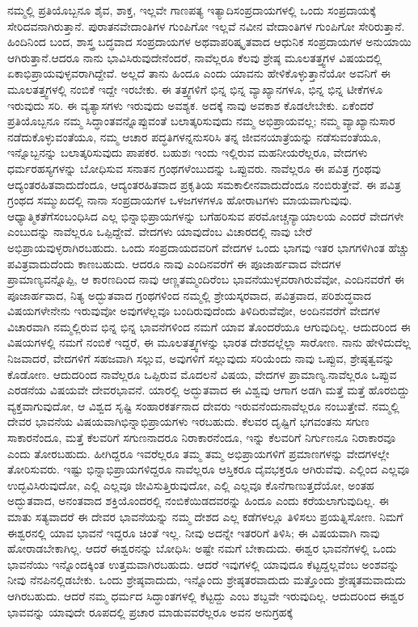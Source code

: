 ನಮ್ಮಲ್ಲಿ ಪ್ರತಿಯೊಬ್ಬನೂ ಶೈವ, ಶಾಕ್ತ, ಇಲ್ಲವೇ ಗಾಣಪತ್ಯ ಇತ್ಯಾದಿ\break ಸಂಪ್ರದಾಯಗಳಲ್ಲಿ ಒಂದು ಸಂಪ್ರದಾಯಕ್ಕೆ ಸೇರಿದವನಾಗಿರುತ್ತಾನೆ. ಪುರಾತನ\break ವೇದಾಂತಿಗಳ ಗುಂಪಿಗೋ ಇಲ್ಲವೆ ನವೀನ ವೇದಾಂತಿಗಳ ಗುಂಪಿಗೋ ಸೇರಿರುತ್ತಾನೆ. ಹಿಂದಿನಿಂದ ಬಂದ, ಶಾಸ್ತ್ರ ಬದ್ಧವಾದ ಸಂಪ್ರದಾಯಗಳ ಅಥವಾ\break ಪರಿಷ್ಕೃತವಾದ ಆಧುನಿಕ ಸಂಪ್ರದಾಯಗಳ ಅನುಯಾಯಿ ಆಗಿರುತ್ತಾನೆ.\break ಆದರೂ ನಾನು ಭಾವಿಸಿರುವುದೇನೆಂದರೆ, ನಾವೆಲ್ಲರೂ ಕೆಲವು ಶ್ರೇಷ್ಠ ಮೂಲತತ್ತ್ವಗಳ ವಿಷಯದಲ್ಲಿ ಏಕಾಭಿಪ್ರಾಯವುಳ್ಳವರಾಗಿದ್ದೇವೆ. ಅಲ್ಲದೆ ತಾನು ಹಿಂದೂ ಎಂದು ಯಾವನು ಹೇಳಿಕೊಳ್ಳುತ್ತಾನೆಯೋ ಅವನಿಗೆ ಈ ಮೂಲತತ್ತ್ವಗಳಲ್ಲಿ ನಂಬಿಕೆ ಇದ್ದೇ ಇರಬೇಕು. ಈ ತತ್ತ್ವಗಳಿಗೆ ಭಿನ್ನ ಭಿನ್ನ ವ್ಯಾಖ್ಯಾನಗಳೂ, ಭಿನ್ನ ಭಿನ್ನ ಟೀಕೆಗಳೂ ಇರುವುದು ಸರಿ. ಈ ವ್ಯತ್ಯಾಸಗಳು ಇರುವುದು ಅವಶ್ಯಕ. ಅದಕ್ಕೆ ನಾವು ಅವಕಾಶ ಕೊಡಲೇಬೇಕು. ಏಕೆಂದರೆ ಪ್ರತಿಯೊಬ್ಬನೂ ನಮ್ಮ ಸಿದ್ಧಾಂತವನ್ನೊಪ್ಪುವಂತೆ ಬಲಾತ್ಕರಿಸುವುದು ನಮ್ಮ ಅಭಿಪ್ರಾಯವಲ್ಲ; ನಮ್ಮ ವ್ಯಾಖ್ಯಾನುಸಾರ ನಡೆದುಕೊಳ್ಳುವಂತೆಯೂ, ನಮ್ಮ ಆಚಾರ ಪದ್ಧತಿಗಳನ್ನನುಸರಿಸಿ ತನ್ನ ಜೀವನಯಾತ್ರೆಯನ್ನು ನಡೆಸುವಂತೆಯೂ, ಇನ್ನೊಬ್ಬನನ್ನು ಬಲಾತ್ಕರಿಸುವುದು ಪಾಪಕರ. ಬಹುಶಃ ಇಂದು ಇಲ್ಲಿರುವ ಮಹನೀಯ\-ರೆಲ್ಲರೂ, ವೇದಗಳು ಧರ್ಮರಹಸ್ಯಗಳನ್ನು ಬೋಧಿಸುವ ಸನಾತನ ಗ್ರಂಥಗಳೆಂಬುದನ್ನು ಒಪ್ಪುವರು. ನಾವೆಲ್ಲರೂ ಈ ಪವಿತ್ರ ಗ್ರಂಥವು ಆದ್ಯಂತರಹಿತವಾದುದೆಂದೂ, ಆದ್ಯಂತರಹಿತವಾದ ಪ್ರಕೃತಿಯ ಸಮಕಾಲೀನವಾದುದೆಂದೂ ನಂಬಿರುತ್ತೇವೆ. ಈ ಪವಿತ್ರ ಗ್ರಂಥದ ಸಮ್ಮುಖದಲ್ಲಿ ನಾನಾ ಸಂಪ್ರದಾಯಗಳ ಒಳಜಗಳಗಳೂ ಹೋರಾಟಗಳು ಮಾಯವಾಗುವುವು. ಆಧ್ಯಾತ್ಮಿಕತೆಗೆ\break ಸಂಬಂಧಿಸಿದ ಎಲ್ಲ ಭಿನ್ನಾಭಿಪ್ರಾಯಗಳನ್ನು ಬಗೆಹರಿಸುವ ಪರಮೋಚ್ಚ\break ನ್ಯಾಯಾಲಯ ಎಂದರೆ ವೇದಗಳೇ ಎಂಬುದನ್ನು ನಾವೆಲ್ಲರೂ ಒಪ್ಪಿದ್ದೇವೆ. ವೇದಗಳು ಯಾವುದೆಂಬ ವಿಚಾರದಲ್ಲಿ ನಾವು ಬೇರೆ ಅಭಿಪ್ರಾಯವುಳ್ಳರಾಗಿರಬಹುದು. ಒಂದು ಸಂಪ್ರದಾಯದವರಿಗೆ ವೇದಗಳ ಒಂದು ಭಾಗವು ಇತರ ಭಾಗಗಳಿಗಿಂತ ಹೆಚ್ಚು ಪವಿತ್ರವಾದುದೆಂದು ಕಾಣಬಹುದು. ಆದರೂ ನಾವು ಎಂದಿನವರೆಗೆ ಈ ಪೂಜಾರ್ಹವಾದ ವೇದಗಳ ಪ್ರಾಮಾಣ್ಯವನ್ನೊಪ್ಪಿ, ಆ ಕಾರಣದಿಂದ ನಾವು ಆಣ್ಣತಮ್ಮಂದಿರೆಂಬ ಭಾವನೆಯುಳ್ಳವರಾಗಿರುವೆವೋ, ಎಂದಿನವರೆಗೆ ಈ ಪೂಜಾರ್ಹವಾದ, ನಿತ್ಯ ಅದ್ಭುತವಾದ ಗ್ರಂಥಗಳಿಂದ ನಮ್ಮಲ್ಲಿ ಶ್ರೇಯಸ್ಕರವಾದ, ಪವಿತ್ರವಾದ, ಪರಿಶುದ್ಧವಾದ ವಿಷಯಗಳೇನೇನು ಇರುವುವೋ ಅವುಗಳೆಲ್ಲವೂ ಬಂದಿರುವುದೆಂದು ತಿಳಿದಿರುವೆವೋ, ಅಂದಿನವರೆಗೆ ವೇದಗಳ ವಿಚಾರವಾಗಿ ನಮ್ಮಲ್ಲಿರುವ ಭಿನ್ನ ಭಿನ್ನ ಭಾವನೆಗಳಿಂದ ನಮಗೆ ಯಾವ ತೊಂದರೆಯೂ ಆಗುವುದಿಲ್ಲ. ಆದುದರಿಂದ ಈ ವಿಷಯಗಳಲ್ಲಿ ನಮಗೆ ನಂಬಿಕೆ ಇದ್ದರೆ, ಈ ಮೂಲತತ್ತ್ವಗಳನ್ನು ಭಾರತ ದೇಶದಲ್ಲೆಲ್ಲಾ ಸಾರೋಣ. ನಾನು ಹೇಳಿದುದೆಲ್ಲ ನಿಜವಾದರೆ, ವೇದಗಳಿಗೆ ಸಹಜವಾಗಿ ಸಲ್ಲುವ, ಅವುಗಳಿಗೆ ಸಲ್ಲುವುದು ಸರಿಯೆಂದು ನಾವು ಒಪ್ಪುವ, ಶ್ರೇಷ್ಠತ್ವವನ್ನು ಕೊಡೋಣ. ಆದುದರಿಂದ ನಾವೆಲ್ಲರೂ ಒಪ್ಪಿರುವ ಮೊದಲನೆ ವಿಷಯ, ವೇದಗಳ ಪ್ರಾಮಾಣ್ಯ.\break ನಾವೆಲ್ಲರೂ ಒಪ್ಪುವ ಎರಡನೆಯ ವಿಷಯವೇ ದೇವರಭಾವನೆ. ಯಾರಲ್ಲಿ ಅದ್ಭುತ\-ವಾದ ಈ ವಿಶ್ವವು ಆಗಾಗ ಅಡಗಿ ಮತ್ತೆ ಮತ್ತೆ ಹೊರಬಿದ್ದು ವ್ಯಕ್ತವಾಗುವುದೋ, ಆ ವಿಶ್ವದ ಸೃಷ್ಟಿ ಸಂಹಾರಕರ್ತನಾದ ದೇವರು ಇರುವನೆಂದು\break ನಾವೆಲ್ಲರೂ ನಂಬುತ್ತೇವೆ. ನಮ್ಮಲ್ಲಿ ದೇವರ ಭಾವನೆಯ ವಿಷಯವಾಗಿ\break ಭಿನ್ನಾಭಿಪ್ರಾಯಗಳು ಇರಬಹುದು. ಕೆಲವರ ದೃಷ್ಟಿಗೆ ಭಗವಂತನು ಸಗುಣ ಸಾಕಾರನೆಂದೂ, ಮತ್ತೆ ಕೆಲವರಿಗೆ ಸಗುಣನಾದರೂ ನಿರಾಕಾರನೆಂದೂ, ಇನ್ನು ಕೆಲವರಿಗೆ ನಿರ್ಗುಣನೂ ನಿರಾಕಾರವೂ ಎಂದು ತೋರಬಹುದು. ಹೀಗಿದ್ದರೂ ಇವರೆಲ್ಲರೂ ತಮ್ಮ ತಮ್ಮ ಅಭಿಪ್ರಾಯಗಳಿಗೆ ಪ್ರಮಾಣಗಳನ್ನು ವೇದಗಳಲ್ಲೇ ತೋರಿಸುವರು. ಇಷ್ಟು ಭಿನ್ನಾಭಿಪ್ರಾಯಗಳಿದ್ದರೂ ನಾವೆಲ್ಲರೂ ಆಸ್ತಿಕರೂ ದೈವಭಕ್ತರೂ ಆಗಿರುವೆವು. ಎಲ್ಲಿಂದ ಎಲ್ಲವೂ ಉದ್ಭವಿಸಿರುವುದೋ, ಎಲ್ಲಿ ಎಲ್ಲವೂ ಜೀವಿಸುತ್ತಿರುವುದೋ, ಎಲ್ಲಿ ಎಲ್ಲವೂ ಕೊನೆಗಾಣುತ್ತದೆಯೋ, ಅಂತಹ ಅದ್ಭುತವಾದ, ಅನಂತವಾದ ಶಕ್ತಿಯೊಂದರಲ್ಲಿ ನಂಬಿಕೆಯಿಡದವರನ್ನು ಹಿಂದೂ ಎಂದು ಕರೆಯಲಾಗುವುದಿಲ್ಲ. ಈ ಮಾತು ಸತ್ಯವಾದರೆ ಈ ದೇವರ ಭಾವನೆಯನ್ನು ನಮ್ಮ ದೇಶದ ಎಲ್ಲ ಕಡೆಗಳಲ್ಲೂ ತಿಳಿಸಲು ಪ್ರಯತ್ನಿಸೋಣ. ನಿಮಗೆ ಈಶ್ವರನಲ್ಲಿ ಯಾವ ಭಾವನೆ ಇದ್ದರೂ ಚಿಂತೆ ಇಲ್ಲ. ನೀವು ಅದನ್ನೇ ಇತರರಿಗೆ ತಿಳಿಸಿ; ಈ ವಿಷಯವಾಗಿ ನಾವು ಹೋರಾಡಬೇಕಾಗಿಲ್ಲ. ಆದರೆ ಈಶ್ವರನನ್ನು ಬೋಧಿಸಿ: ಅಷ್ಟೇ ನಮಗೆ ಬೇಕಾದುದು. ಈಶ್ವರ ಭಾವನೆಗಳಲ್ಲಿ ಒಂದು ಭಾವನೆಯು ಇನ್ನೊಂದಕ್ಕಿಂತ ಉತ್ತಮವಾಗಿರಬಹುದು. ಆದರೆ ಇವುಗಳಲ್ಲಿ ಯಾವುದೂ ಕೆಟ್ಟದ್ದಲ್ಲವೆಂಬ ಅಂಶವನ್ನು ನೀವು ನೆನಪಿನಲ್ಲಿಡಬೇಕು. ಒಂದು ಶ್ರೇಷ್ಠವಾದುದು, ಇನ್ನೊಂದು ಶ್ರೇಷ್ಠತರವಾದುದು ಮತ್ತೊಂದು ಶ್ರೇಷ್ಠತಮವಾದುದು ಆಗಿರಬಹುದು. ಆದರೆ ನಮ್ಮ ಧರ್ಮದ ಸಿದ್ಧಾಂತಗಳಲ್ಲಿ ಕೆಟ್ಟದ್ದು ಎಂಬ ಶಬ್ದವೇ ಇರುವುದಿಲ್ಲ. ಆದುದರಿಂದ ಈಶ್ವರ ಭಾವವನ್ನು ಯಾವುದೇ ರೂಪದಲ್ಲಿ ಪ್ರಚಾರ ಮಾಡುವವರೆಲ್ಲರೂ ಅವನ ಅನುಗ್ರಹಕ್ಕೆ 